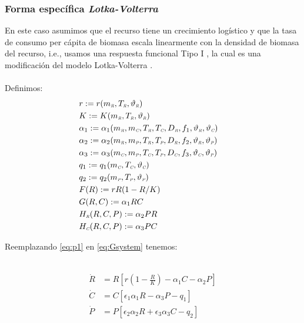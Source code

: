 \subsubsection{Forma espec\'ifica  \emph{Lotka-Volterra}}
En este caso asumimos que el recurso tiene un crecimiento log\'istico y que la tasa de consumo per c\'apita de biomasa escala linearmente con la densidad de biomasa del recurso, i.e., usamos una respuesta funcional Tipo I \citep{gotelliprimer}, la cual es una modificaci\'on del modelo Lotka-Volterra \citep{gotelliprimer}.\\
\mbox{}\\
Definimos:
\begin{equation}\label{eq:p1}
\begin{aligned}
&r := r(m_{\textit{\tiny R}},T_{\textit{\tiny R}},\vartheta_{\textit{\tiny R}})&\\ 
&K := K(m_{\textit{\tiny R}},T_{\textit{\tiny R}},\vartheta_{\textit{\tiny R}})&\\
&\alpha_{1} := \alpha_{1}(m_{\textit{\tiny R}},m_{\textit{\tiny C}},T_{\textit{\tiny R}},T_{\textit{\tiny C}},D_{\textit{\tiny R}},f_1,\vartheta_{\textit{\tiny R}},\vartheta_{\textit{\tiny C}})&\\
&\alpha_{2} := \alpha_{2}(m_{\textit{\tiny R}},m_{\textit{\tiny P}},T_{\textit{\tiny R}},T_{\textit{\tiny P}},D_{\textit{\tiny R}},f_2,\vartheta_{\textit{\tiny R}},\vartheta_{\textit{\tiny P}})&\\
&\alpha_{3} := \alpha_{3}(m_{\textit{\tiny C}},m_{\textit{\tiny P}},T_{\textit{\tiny C}},T_{\textit{\tiny P}},D_{\textit{\tiny C}},f_3,\vartheta_{\textit{\tiny C}},\vartheta_{\textit{\tiny P}})& \\
&q_1 := q_1(m_{\textit{\tiny C}},T_{\textit{\tiny C}},\vartheta_{\textit{\tiny C}})& \\ 
&q_2 := q_2(m_{\textit{\tiny P}},T_{\textit{\tiny P}},\vartheta_{\textit{\tiny P}})&\\
&F(R):= rR(1-R/K)& \\
&G(R,C):= \alpha_1 RC &\\ 
&H_{\textit{\tiny R}}(R,C,P):= \alpha_2PR&\\
&H_{\textit{\tiny C}}(R,C,P):= \alpha_3PC&
\end{aligned}
\end{equation}

Reemplazando \eqref{eq:p1} en \eqref{eq:Gsystem} tenemos:

\
\begin{equation}
\begin{aligned} 
\dot{R} &= R\left[ r(1-\frac{R}{K})- \alpha_1 C -\alpha_2 P \right] \\
\dot{C} &= C \left[ \epsilon_1 \alpha_1 R - \alpha_3  P - q_1 \right] \\
\dot{P} &= P \left[ \epsilon_2 \alpha_2 R + \epsilon_3 \alpha_3 C - q_2 \right]
\end{aligned}
\end{equation}


